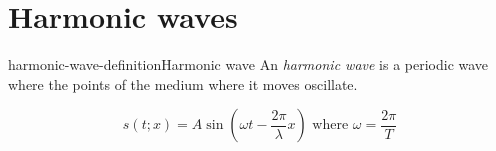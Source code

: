 \documentclass[preview]{standalone}
\begin{document}
\section{Harmonic waves}

\begin{snippetdefinition}{harmonic-wave-definition}{Harmonic wave}
    An \textit{harmonic wave} is a periodic wave where
    the points of the medium where it moves oscillate.

    \[
        s(t;x) = A \sin
        \left(
            \omega t - \frac{2\pi}{\lambda}x
        \right)
        \text{ where } \omega = \frac{2\pi}{T}
    \]
\end{snippetdefinition}
\end{document}
